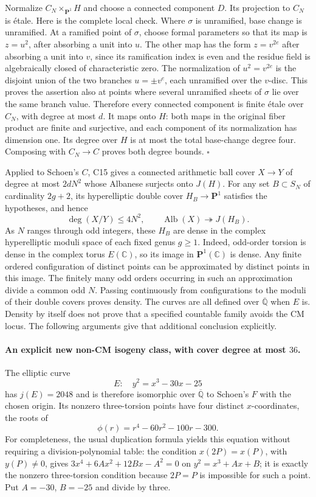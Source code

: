 \documentclass[11pt]{article}
\newcommand{\Q}{\mathbb Q}\newcommand{\C}{\mathbb C}\newcommand{\Z}{\mathbb Z}\newcommand{\R}{\mathbb R}\newcommand{\A}{\mathbb A}\newcommand{\OO}{\mathcal O}
\theoremstyle{definition}\newtheorem{definition}[theorem]{Definition}\newtheorem{remark}[theorem]{Remark}
\begin{document}
Normalize $C_N\times_{\mathbf P^1}H$ and choose a connected component
$D$.  Its projection to $C_N$ is \'{e}tale.  Here is the complete local
check.  Where $\sigma$ is unramified, base change is unramified.  At a
ramified point of $\sigma$, choose formal parameters so that its map is
$z=u^2$, after absorbing a unit into $u$.  The other map has the form
$z=v^{2e}$ after absorbing a unit into $v$, since its ramification index
is even and the residue field is algebraically closed of characteristic
zero.  The normalization of $u^2=v^{2e}$ is the disjoint union of the
two branches $u=\pm v^e$, each unramified over the $v$-disc.  This proves
the assertion also at points where several unramified sheets of $\sigma$
lie over the same branch value.  Therefore every connected component is
finite \'{e}tale over $C_N$, with degree at most $d$.  It maps onto $H$:
both maps in the original fiber product are finite and surjective, and
each component of its normalization has dimension one.  Its degree over
$H$ is at most the total base-change degree four.  Composing with
$C_N\to C$ proves both degree bounds. \hfill$\square$

Applied to Schoen's $C$, C15 gives a connected arithmetic ball cover
$X\to Y$ of degree at most $2dN^2$ whose Albanese surjects onto $J(H)$.
For any set $B\subset S_N$ of cardinality $2g+2$, its hyperelliptic
double cover $H_B\to\mathbf P^1$ satisfies the hypotheses, and hence
\[
 \deg(X/Y)\leq4N^2,\qquad
 \operatorname{Alb}(X)\twoheadrightarrow J(H_B).
\]
As $N$ ranges through odd integers, these $H_B$ are dense in the complex
hyperelliptic moduli space of each fixed genus $g\geq1$.  Indeed, odd-order
torsion is dense in the complex torus $E(\C)$, so its image in
$\mathbf P^1(\C)$ is dense.  Any finite ordered configuration of distinct
points can be approximated by distinct points in this image.  The finitely
many odd orders occurring in such an approximation divide a common odd
$N$.  Passing continuously from configurations to the moduli of their
double covers proves density.  The curves are all defined over
$\overline{\Q}$ when $E$ is.  Density by itself does not prove that a
specified countable family avoids the CM locus.  The following arguments
give that additional conclusion explicitly.

\paragraph{An explicit new non-CM isogeny class, with cover degree at most $36$.}
The elliptic curve
\[
 E:\quad y^2=x^3-30x-25
\]
has $j(E)=2048$ and is therefore isomorphic over $\overline{\Q}$ to
Schoen's $F$ with the chosen origin.  Its nonzero three-torsion points have
four distinct $x$-coordinates, the roots of
\[
 \phi(r)=r^4-60r^2-100r-300.
\]
For completeness, the usual duplication formula yields this equation
without requiring a division-polynomial table: the condition
$x(2P)=x(P)$, with $y(P)\neq0$, gives
$3x^4+6Ax^2+12Bx-A^2=0$ on $y^2=x^3+Ax+B$; it is exactly the
nonzero three-torsion condition because $2P=P$ is impossible for such a
point.  Put $A=-30$, $B=-25$ and divide by three.
\end{document}
